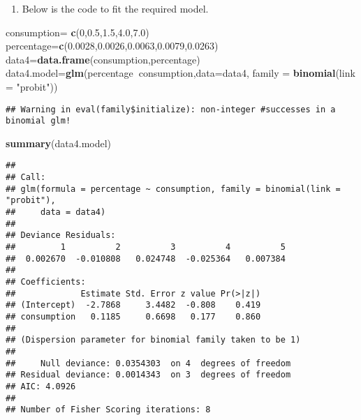 \documentclass[
]{article}
\newenvironment{Shaded}{\begin{snugshade}}{\end{snugshade}}
\newcommand{\DataTypeTok}[1]{\textcolor[rgb]{0.13,0.29,0.53}{#1}}
\newcommand{\DecValTok}[1]{\textcolor[rgb]{0.00,0.00,0.81}{#1}}
\newcommand{\FloatTok}[1]{\textcolor[rgb]{0.00,0.00,0.81}{#1}}
\newcommand{\KeywordTok}[1]{\textcolor[rgb]{0.13,0.29,0.53}{\textbf{#1}}}
\newcommand{\NormalTok}[1]{#1}
\newcommand{\OperatorTok}[1]{\textcolor[rgb]{0.81,0.36,0.00}{\textbf{#1}}}
\newcommand{\StringTok}[1]{\textcolor[rgb]{0.31,0.60,0.02}{#1}}
\providecommand{\tightlist}{%
  \setlength{\itemsep}{0pt}\setlength{\parskip}{0pt}}
\begin{document}
\begin{enumerate}
\def\labelenumi{\alph{enumi})}
\setcounter{enumi}{2}
\tightlist
\item
  Below is the code to fit the required model.
\end{enumerate}

\begin{Shaded}
\begin{Highlighting}[]
\NormalTok{consumption=}\StringTok{ }\KeywordTok{c}\NormalTok{(}\DecValTok{0}\NormalTok{,}\FloatTok{0.5}\NormalTok{,}\FloatTok{1.5}\NormalTok{,}\FloatTok{4.0}\NormalTok{,}\FloatTok{7.0}\NormalTok{)}
\NormalTok{percentage=}\KeywordTok{c}\NormalTok{(}\FloatTok{0.0028}\NormalTok{,}\FloatTok{0.0026}\NormalTok{,}\FloatTok{0.0063}\NormalTok{,}\FloatTok{0.0079}\NormalTok{,}\FloatTok{0.0263}\NormalTok{)}
\NormalTok{data4=}\KeywordTok{data.frame}\NormalTok{(consumption,percentage)}
\NormalTok{data4.model=}\KeywordTok{glm}\NormalTok{(percentage}\OperatorTok{~}\NormalTok{consumption,}\DataTypeTok{data=}\NormalTok{data4, }\DataTypeTok{family =} \KeywordTok{binomial}\NormalTok{(}\DataTypeTok{link =} \StringTok{"probit"}\NormalTok{))}
\end{Highlighting}
\end{Shaded}

\begin{verbatim}
## Warning in eval(family$initialize): non-integer #successes in a binomial glm!
\end{verbatim}

\begin{Shaded}
\begin{Highlighting}[]
\KeywordTok{summary}\NormalTok{(data4.model)}
\end{Highlighting}
\end{Shaded}

\begin{verbatim}
## 
## Call:
## glm(formula = percentage ~ consumption, family = binomial(link = "probit"), 
##     data = data4)
## 
## Deviance Residuals: 
##         1          2          3          4          5  
##  0.002670  -0.010808   0.024748  -0.025364   0.007384  
## 
## Coefficients:
##             Estimate Std. Error z value Pr(>|z|)
## (Intercept)  -2.7868     3.4482  -0.808    0.419
## consumption   0.1185     0.6698   0.177    0.860
## 
## (Dispersion parameter for binomial family taken to be 1)
## 
##     Null deviance: 0.0354303  on 4  degrees of freedom
## Residual deviance: 0.0014343  on 3  degrees of freedom
## AIC: 4.0926
## 
## Number of Fisher Scoring iterations: 8
\end{verbatim}
\end{document}
